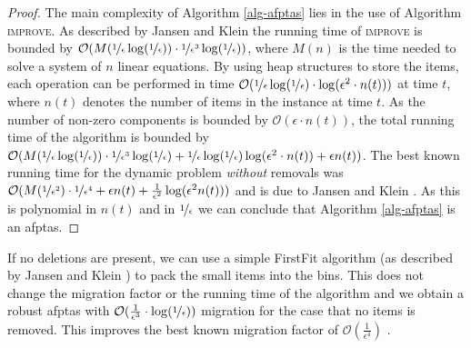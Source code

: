 \begin{proof}
    The main complexity of Algorithm \ref{alg-afptas} lies in the use of
    Algorithm \textsc{improve}. As described by Jansen and Klein
    \cite{jansen2013binpacking} the running time of \textsc{improve} is
    bounded by $\mathcal{O}(M(\nicefrac{1}{\epsilon}
    \log(\nicefrac{1}{\epsilon}))\cdot \nicefrac{1}{\epsilon^3}
    \log(\nicefrac{1}{\epsilon}))$, where $M(n)$ is the time needed to
    solve a system of $n$ linear equations. By using heap structures to
    store the items, each operation can be performed in time
    $\mathcal{O}(\nicefrac{1}{\epsilon}
    \log(\nicefrac{1}{\epsilon})\cdot \log(\epsilon^2\cdot n(t)))$ at
    time $t$, where $n(t)$ denotes the number of items in the instance
    at time $t$. As the number of non-zero components is bounded by
    $\mathcal{O}(\epsilon\cdot n(t))$, the total running time of the
    algorithm is bounded by $\mathcal{O}(M(\nicefrac{1}{\epsilon}
    \log(\nicefrac{1}{\epsilon}))\cdot \nicefrac{1}{\epsilon^3}
    \log(\nicefrac{1}{\epsilon})+\nicefrac{1}{\epsilon}
    \log(\nicefrac{1}{\epsilon}) \log(\epsilon^2\cdot n(t))+\epsilon
    n(t))$. The best known running time for the dynamic \BP problem
    \emph{without} removals was
    $\mathcal{O}(M(\nicefrac{1}{\epsilon^2})\cdot
    \nicefrac{1}{\epsilon^4}+\epsilon
    n(t)+\frac{1}{\epsilon^2}\log(\epsilon^2 n(t)))$ and is due to
    Jansen and Klein \cite{jansen2013binpacking}.  As this is polynomial
    in $n(t)$ and in $\nicefrac{1}{\epsilon}$ we can conclude that
    Algorithm \ref{alg-afptas} is an \ac{afptas}.
\end{proof}

If no deletions are present, we can use a simple FirstFit algorithm (as described by Jansen and Klein \cite{jansen2013binpacking}) to pack the small items into the bins. This does not change the migration factor or the running time of the algorithm and we obtain a robust \ac{afptas} with $\mathcal{O}(\frac{1}{\epsilon^3}\cdot \log(\nicefrac{1}{\epsilon}))$ migration for the case that no items is removed. This improves the best known migration factor of $\mathcal{O}(\frac{1}{\epsilon^4})$ \cite{jansen2013binpacking}.



















